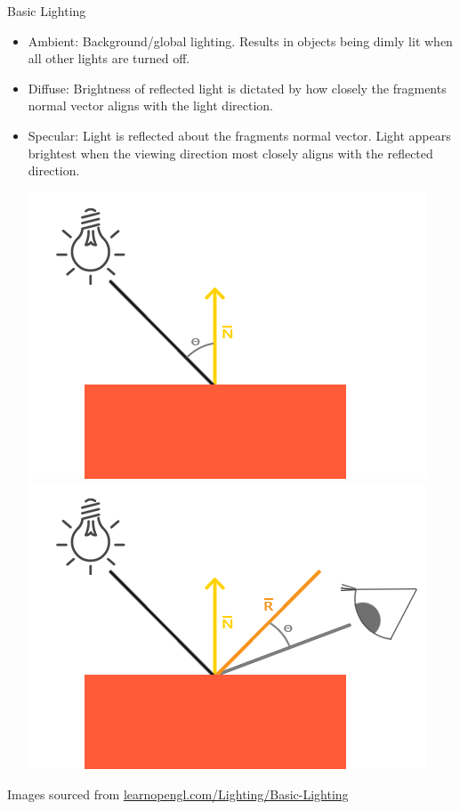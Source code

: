 \documentclass{beamer}
\begin{document}
\begin{frame}[fragile]{Basic Lighting}
    \begin{itemize}
        \item Ambient: Background/global lighting. Results in objects being dimly lit when all 
            other lights are turned off.
        \item Diffuse: Brightness of reflected light is dictated by how closely the fragments 
            normal vector aligns with the light direction.
        \item Specular: Light is reflected about the fragments normal vector. Light appears 
            brightest when the viewing direction most closely aligns with the reflected direction.
        \begin{center}
            \includegraphics[height=0.30\textheight]{images/diffuse_light.png}
            \includegraphics[height=0.30\textheight]{images/specular_light.png}
        \end{center}
    \end{itemize}
    \vfill{}
    {\footnotesize{Images sourced from \url{learnopengl.com/Lighting/Basic-Lighting}}}
\end{frame}
\end{document}
